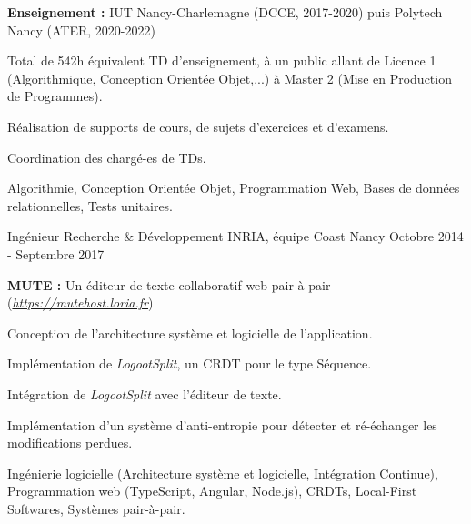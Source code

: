 \begin{cventries}
\begin{cvparagraph}
    \textbf{Enseignement :} IUT Nancy-Charlemagne (DCCE, 2017-2020) puis Polytech Nancy (ATER, 2020-2022)

    \medskip
    \begin{cvitems} %
        \item Total de 542h équivalent TD d'enseignement, à un public allant de Licence 1 (Algorithmique, Conception Orientée Objet,...) à Master 2 (Mise en Production de Programmes).
        \item Réalisation de supports de cours, de sujets d'exercices et d'examens.
        \item Coordination des chargé-es de TDs.
    \end{cvitems}

    \medskip
     Algorithmie, Conception Orientée Objet, Programmation Web, Bases de données relationnelles, Tests unitaires.
\end{cvparagraph}

\cventry
    {Ingénieur Recherche \& Développement} %
    {INRIA, équipe Coast} %
    {Nancy} %
    {Octobre 2014 - Septembre 2017} %
    {}

\vspace{-1.5em}
\begin{cvparagraph}
    \textbf{MUTE :} Un éditeur de texte collaboratif web pair-à-pair (\href{https://mutehost.loria.fr}{\emph{https://mutehost.loria.fr}})

    \medskip
    \begin{cvitems} %
        \item Conception de l'architecture système et logicielle de l'application.
        \item Implémentation de \emph{LogootSplit}, un CRDT pour le type Séquence.
        \item Intégration de \emph{LogootSplit} avec l'éditeur de texte.
        \item Implémentation d'un système d'anti-entropie pour détecter et ré-échanger les modifications perdues.
    \end{cvitems}

    \medskip
     Ingénierie logicielle (Architecture système et logicielle, Intégration Continue), Programmation web (TypeScript, Angular, Node.js), CRDTs, Local-First Softwares, Systèmes pair-à-pair.
\end{cvparagraph}


\end{cventries}

